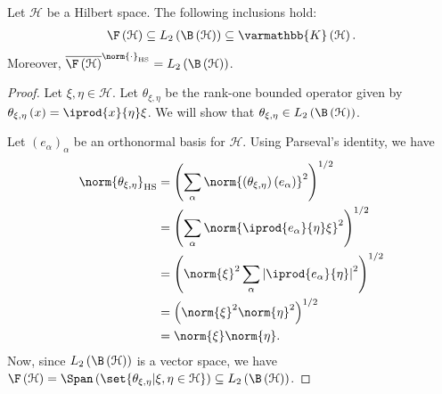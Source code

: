 \documentclass[10pt]{mypackage}
\renewcommand*{\mathbb}[1]{\varmathbb{#1}}
\DeclareMathOperator{\hs}{HS}
\begin{document}
\begin{proposition}
  Let $\mathcal{H}$ be a Hilbert space. The following inclusions hold:
  \begin{align*}
    \F\left( \mathcal{H} \right) \subseteq L_2\left( \B\left( \mathcal{H} \right) \right) \subseteq \mathbb{K}\left( \mathcal{H} \right).
  \end{align*}
  Moreover, $\overline{\F\left( \mathcal{H} \right)}^{\norm{\cdot}_{\hs}} = L_2\left( \B\left( \mathcal{H} \right) \right)$.
\end{proposition}
\begin{proof}
  Let $\xi,\eta\in \mathcal{H}$. Let $\theta_{\xi,\eta}$ be the rank-one bounded operator given by $\theta_{\xi,\eta}\left( x \right) = \iprod{x}{\eta}\xi$. We will show that $\theta_{\xi,\eta}\in L_2\left( \B\left( \mathcal{H} \right) \right)$.\newline

  Let $\left( e_{\alpha} \right)_{\alpha}$ be an orthonormal basis for $\mathcal{H}$. Using Parseval's identity, we have
  \begin{align*}
    \norm{\theta_{\xi,\eta}}_{\hs} &= \left( \sum_{\alpha}\norm{\left( \theta_{\xi,\eta} \right)\left( e_{\alpha} \right)}^2 \right)^{1/2}\\
                                   &= \left( \sum_{\alpha}\norm{ \iprod{e_{\alpha}}{\eta}\xi }^2 \right)^{1/2}\\
                                   &= \left( \norm{\xi}^2\sum_{\alpha}\left\vert \iprod{e_{\alpha}}{\eta} \right\vert^2 \right)^{1/2}\\
                                   &= \left( \norm{\xi}^2\norm{\eta}^2 \right)^{1/2}\\
                                   &= \norm{\xi}\norm{\eta}.
  \end{align*}
  Now, since $L_2\left( \B\left( \mathcal{H} \right) \right)$ is a vector space, we have $\F\left( \mathcal{H} \right) = \Span\left( \set{\theta_{\xi,\eta} | \xi,\eta\in \mathcal{H}} \right)\subseteq L_2\left( \B\left( \mathcal{H} \right) \right)$.\newline


\end{proof}
\end{document}
